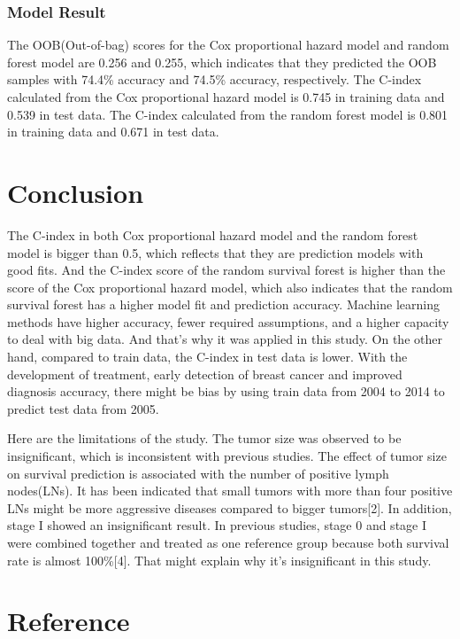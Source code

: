 \documentclass[
  12pt,
]{article}
\begin{document}
\hypertarget{model-result}{%
\subsubsection{Model Result}\label{model-result}}

The OOB(Out-of-bag) scores for the Cox proportional hazard model and
random forest model are 0.256 and 0.255, which indicates that they
predicted the OOB samples with 74.4\% accuracy and 74.5\% accuracy,
respectively. The C-index calculated from the Cox proportional hazard
model is 0.745 in training data and 0.539 in test data. The C-index
calculated from the random forest model is 0.801 in training data and
0.671 in test data.

\hypertarget{conclusion}{%
\section{Conclusion}\label{conclusion}}

The C-index in both Cox proportional hazard model and the random forest
model is bigger than 0.5, which reflects that they are prediction models
with good fits. And the C-index score of the random survival forest is
higher than the score of the Cox proportional hazard model, which also
indicates that the random survival forest has a higher model fit and
prediction accuracy. Machine learning methods have higher accuracy,
fewer required assumptions, and a higher capacity to deal with big data.
And that's why it was applied in this study. On the other hand, compared
to train data, the C-index in test data is lower. With the development
of treatment, early detection of breast cancer and improved diagnosis
accuracy, there might be bias by using train data from 2004 to 2014 to
predict test data from 2005.

Here are the limitations of the study. The tumor size was observed to be
insignificant, which is inconsistent with previous studies. The effect
of tumor size on survival prediction is associated with the number of
positive lymph nodes(LNs). It has been indicated that small tumors with
more than four positive LNs might be more aggressive diseases compared
to bigger tumors{[}2{]}. In addition, stage I showed an insignificant
result. In previous studies, stage 0 and stage I were combined together
and treated as one reference group because both survival rate is almost
100\%{[}4{]}. That might explain why it's insignificant in this study.

\hypertarget{reference}{%
\section{Reference}\label{reference}}
\end{document}
